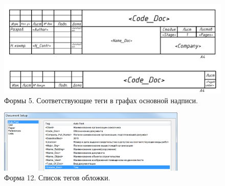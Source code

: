 \documentclass[14pt]{extreport}
\begin{document}
\begin{figure}[h]
	\centering
	\includegraphics[width=\textwidth]{SPDS_TEXT_DOC_with_tagname}
    \caption{Формы 5. Соответствующие теги в графах основной надписи.\label{SPDS_TEXT_DOC_with_tagname}}
\end{figure}

\begin{figure}[h]
	\centering
	\includegraphics[width=0.8\textwidth]{SPDS_OBLOZHKA}
	\caption{Форма 12. Список тегов обложки.\label{SPDS_OBLOZHKA}}
\end{figure}
\end{document}
